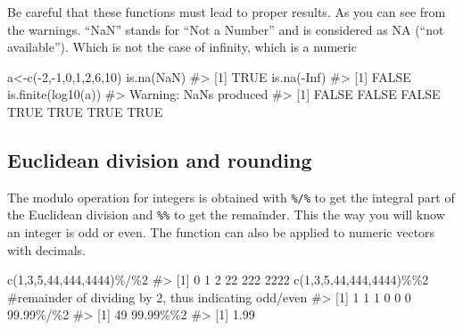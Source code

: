 \documentclass[
  letterpaper,
  DIV=11,
  numbers=noendperiod]{scrreprt}
\newenvironment{Shaded}{\begin{snugshade}}{\end{snugshade}}
\newcommand{\CommentTok}[1]{\textcolor[rgb]{0.37,0.37,0.37}{#1}}
\newcommand{\ConstantTok}[1]{\textcolor[rgb]{0.56,0.35,0.01}{#1}}
\newcommand{\DecValTok}[1]{\textcolor[rgb]{0.68,0.00,0.00}{#1}}
\newcommand{\FloatTok}[1]{\textcolor[rgb]{0.68,0.00,0.00}{#1}}
\newcommand{\FunctionTok}[1]{\textcolor[rgb]{0.28,0.35,0.67}{#1}}
\newcommand{\NormalTok}[1]{\textcolor[rgb]{0.00,0.23,0.31}{#1}}
\newcommand{\OtherTok}[1]{\textcolor[rgb]{0.00,0.23,0.31}{#1}}
\newcommand{\SpecialCharTok}[1]{\textcolor[rgb]{0.37,0.37,0.37}{#1}}
\begin{document}
Be careful that these functions must lead to proper results. As you can
see from the warnings. ``NaN'' stands for ``Not a Number'' and is
considered as NA (``not available''). Which is not the case of infinity,
which is a numeric

\begin{Shaded}
\begin{Highlighting}[]
\NormalTok{a}\OtherTok{\textless{}{-}}\FunctionTok{c}\NormalTok{(}\SpecialCharTok{{-}}\DecValTok{2}\NormalTok{,}\SpecialCharTok{{-}}\DecValTok{1}\NormalTok{,}\DecValTok{0}\NormalTok{,}\DecValTok{1}\NormalTok{,}\DecValTok{2}\NormalTok{,}\DecValTok{6}\NormalTok{,}\DecValTok{10}\NormalTok{)}
\FunctionTok{is.na}\NormalTok{(}\ConstantTok{NaN}\NormalTok{)}
\CommentTok{\#\textgreater{} [1] TRUE}
\FunctionTok{is.na}\NormalTok{(}\SpecialCharTok{{-}}\ConstantTok{Inf}\NormalTok{)}
\CommentTok{\#\textgreater{} [1] FALSE}
\FunctionTok{is.finite}\NormalTok{(}\FunctionTok{log10}\NormalTok{(a))}
\CommentTok{\#\textgreater{} Warning: NaNs produced}
\CommentTok{\#\textgreater{} [1] FALSE FALSE FALSE  TRUE  TRUE  TRUE  TRUE}
\end{Highlighting}
\end{Shaded}

\subsection{Euclidean division and
rounding}\label{euclidean-division-and-rounding}

The modulo operation for integers is obtained with \texttt{\%/\%} to get
the integral part of the Euclidean division and \texttt{\%\%} to get the
remainder. This the way you will know an integer is odd or even. The
function can also be applied to numeric vectors with decimals.

\begin{Shaded}
\begin{Highlighting}[]
\FunctionTok{c}\NormalTok{(}\DecValTok{1}\NormalTok{,}\DecValTok{3}\NormalTok{,}\DecValTok{5}\NormalTok{,}\DecValTok{44}\NormalTok{,}\DecValTok{444}\NormalTok{,}\DecValTok{4444}\NormalTok{)}\SpecialCharTok{\%/\%}\DecValTok{2}
\CommentTok{\#\textgreater{} [1]    0    1    2   22  222 2222}
\FunctionTok{c}\NormalTok{(}\DecValTok{1}\NormalTok{,}\DecValTok{3}\NormalTok{,}\DecValTok{5}\NormalTok{,}\DecValTok{44}\NormalTok{,}\DecValTok{444}\NormalTok{,}\DecValTok{4444}\NormalTok{)}\SpecialCharTok{\%\%}\DecValTok{2} \CommentTok{\#remainder of dividing by 2, thus indicating odd/even}
\CommentTok{\#\textgreater{} [1] 1 1 1 0 0 0}
\FloatTok{99.99}\SpecialCharTok{\%/\%}\DecValTok{2}
\CommentTok{\#\textgreater{} [1] 49}
\FloatTok{99.99}\SpecialCharTok{\%\%}\DecValTok{2}
\CommentTok{\#\textgreater{} [1] 1.99}
\end{Highlighting}
\end{Shaded}
\end{document}
